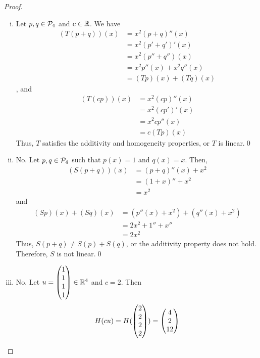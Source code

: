 \begin{proof}
    \renewcommand{\qedsymbol}{$\blacksquare$}
    \begin{enumerate}[(i)]
        \item Let $p,q\in\P_4$ and $c\in\R$. We have 
        \[
            \begin{aligned}
                (T(p+q))(x)
                &= x^2(p+q)''(x)\\
                &= x^2(p'+q')'(x)\\
                &= x^2(p''+q'')(x)\\
                &= x^2p''(x)+x^2q''(x)\\
                &= (Tp)(x)+(Tq)(x)
            \end{aligned}
        \]
        , and 
        \[
            \begin{aligned}
                (T(cp))(x)
                &= x^2(cp)''(x)\\
                &= x^2(cp')'(x)\\
                &= x^2cp''(x)\\
                &= c(Tp)(x)
            \end{aligned}
        \]
        Thus, $T$ satisfies the additivity and homogeneity properties, or $T$ is linear.\qed
        \item No. Let $p,q\in\P_4$ such that $p(x)=1$ and $q(x)=x$. Then, 
        \[
            \begin{aligned}
                (S(p+q))(x)
                &= (p+q)''(x)+x^2\\
                &= (1+x)''+x^2\\
                &= x^2
            \end{aligned}
        \]
        and 
        \[
            \begin{aligned}
                (Sp)(x)+(Sq)(x)
                &= (p''(x)+x^2)+(q''(x)+x^2)\\
                &= 2x^2+1''+x''\\
                &= 2x^2
            \end{aligned}
        \]
        Thus, $S(p+q)\not=S(p)+S(q)$, or the additivity property does not hold. Therefore, $S$ is not linear.\qed
        \item No. Let $u=\ColVecFour{1}{1}{1}{1}\in\R^4$ and $c=2$. Then 
        \[
            \begin{aligned}
                H(cu) = H(\ColVecFour{2}{2}{2}{2}) = \ColVecThree{4}{2}{12}
            \end{aligned}
\]
\end{enumerate}
\end{proof}
